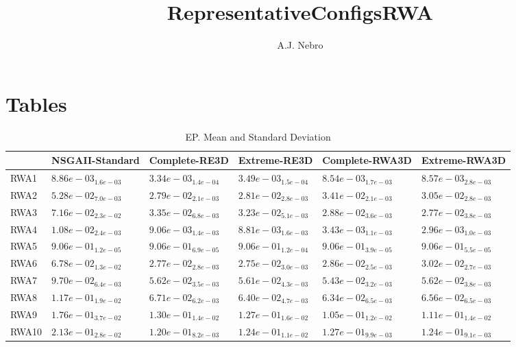 \documentclass{article}
\title{RepresentativeConfigsRWA}
\author{A.J. Nebro}
\begin{document}
\maketitle
\section{Tables}

\begin{table}
\caption{EP. Mean and Standard Deviation}
\label{table: EP}
\centering
\begin{scriptsize}
\begin{tabular}{llllll}
\hline & NSGAII-Standard & Complete-RE3D & Extreme-RE3D & Complete-RWA3D &  Extreme-RWA3D\\
\hline 
RWA1 & $  8.86e-03_{ 1.6e-03}$ & \cellcolor{gray95}$  3.34e-03_{ 1.4e-04}$ & \cellcolor{gray25}$  3.49e-03_{ 1.5e-04}$ & $  8.54e-03_{ 1.7e-03}$ & $  8.57e-03_{ 2.8e-03}$ \\
RWA2 & $  5.28e-02_{ 7.0e-03}$ & \cellcolor{gray95}$  2.79e-02_{ 2.1e-03}$ & \cellcolor{gray25}$  2.81e-02_{ 2.8e-03}$ & $  3.41e-02_{ 2.1e-03}$ & $  3.05e-02_{ 2.8e-03}$ \\
RWA3 & $  7.16e-02_{ 2.3e-02}$ & $  3.35e-02_{ 6.8e-03}$ & $  3.23e-02_{ 5.1e-03}$ & \cellcolor{gray25}$  2.88e-02_{ 3.6e-03}$ & \cellcolor{gray95}$  2.77e-02_{ 3.8e-03}$ \\
RWA4 & $  1.08e-02_{ 2.4e-03}$ & $  9.06e-03_{ 1.4e-03}$ & $  8.81e-03_{ 1.6e-03}$ & \cellcolor{gray25}$  3.43e-03_{ 1.1e-03}$ & \cellcolor{gray95}$  2.96e-03_{ 1.0e-03}$ \\
RWA5 & \cellcolor{gray25}$  9.06e-01_{ 1.2e-05}$ & $  9.06e-01_{ 6.9e-05}$ & $  9.06e-01_{ 1.2e-04}$ & \cellcolor{gray95}$  9.06e-01_{ 3.9e-05}$ & $  9.06e-01_{ 5.5e-05}$ \\
RWA6 & $  6.78e-02_{ 1.3e-02}$ & \cellcolor{gray25}$  2.77e-02_{ 2.8e-03}$ & \cellcolor{gray95}$  2.75e-02_{ 3.0e-03}$ & $  2.86e-02_{ 2.5e-03}$ & $  3.02e-02_{ 2.7e-03}$ \\
RWA7 & $  9.70e-02_{ 6.4e-03}$ & $  5.62e-02_{ 3.5e-03}$ & \cellcolor{gray25}$  5.61e-02_{ 4.3e-03}$ & \cellcolor{gray95}$  5.43e-02_{ 3.2e-03}$ & $  5.62e-02_{ 3.8e-03}$ \\
RWA8 & $  1.17e-01_{ 1.9e-02}$ & $  6.71e-02_{ 6.2e-03}$ & \cellcolor{gray25}$  6.40e-02_{ 4.7e-03}$ & \cellcolor{gray95}$  6.34e-02_{ 6.5e-03}$ & $  6.56e-02_{ 6.5e-03}$ \\
RWA9 & $  1.76e-01_{ 3.7e-02}$ & $  1.30e-01_{ 1.4e-02}$ & $  1.27e-01_{ 1.6e-02}$ & \cellcolor{gray95}$  1.05e-01_{ 1.2e-02}$ & \cellcolor{gray25}$  1.11e-01_{ 1.4e-02}$ \\
RWA10 & $  2.13e-01_{ 2.8e-02}$ & \cellcolor{gray95}$  1.20e-01_{ 8.2e-03}$ & $  1.24e-01_{ 1.1e-02}$ & $  1.27e-01_{ 9.9e-03}$ & \cellcolor{gray25}$  1.24e-01_{ 9.1e-03}$ \\
\hline
\end{tabular}
\end{scriptsize}
\end{table}
\end{document}
